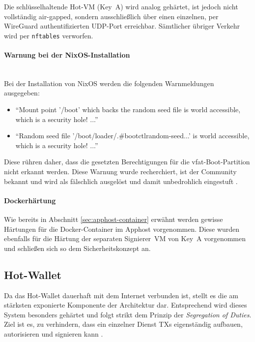 Die schlüsselhaltende Hot-\ac{VM} (Key~A) wird analog gehärtet, ist jedoch nicht vollständig air-gapped, sondern ausschließlich über einen einzelnen, per WireGuard authentifizierten \ac{UDP}-Port erreichbar. Sämtlicher übriger Verkehr wird per \texttt{nftables} verworfen.

\paragraph{Warnung bei der NixOS-Installation} \mbox{}\\
Bei der Installation von NixOS werden die folgenden Warnmeldungen ausgegeben:
\begin{itemize}
    \item \enquote{Mount point '/boot' which backs the random seed file is world accessible, which is a security hole! ...}
    \item \enquote{Random seed file '/boot/loader/.\#bootctlrandom-seed...' is world accessible, which is a security hole! ...}
\end{itemize}

Diese rühren daher, dass die gesetzten Berechtigungen für die vfat-Boot-Partition nicht erkannt werden.
Diese Warnung wurde recherchiert, ist der Community bekannt und wird als fälschlich ausgelöst und damit unbedrohlich eingestuft \cite{nixOS_warnung}.

\paragraph{Dockerhärtung}

Wie bereits in Abschnitt \ref{sec:apphost-container} erwähnt werden gewisse Härtungen für die Docker-Container im Apphost vorgenommen.
Diese wurden ebenfalls für die Härtung der separaten Signierer~\ac{VM} von Key~A vorgenommen und schließen sich so dem Sicherheitskonzept an.

\subsection{Hot-Wallet}

Da das Hot-Wallet dauerhaft mit dem Internet verbunden ist, stellt es die am stärksten exponierte Komponente der Architektur dar. Entsprechend wird dieses System besonders gehärtet und folgt strikt dem Prinzip der \emph{Segregation of Duties}. Ziel ist es, zu verhindern, dass ein einzelner Dienst \acp{TX} eigenständig aufbauen, autorisieren und signieren kann \cite{nadcab_custodial_arch, nist_sp800_53}.

